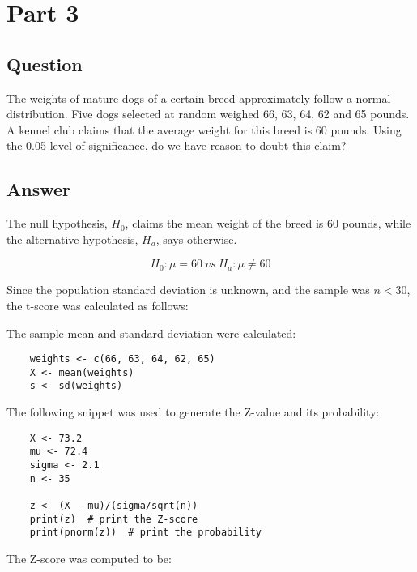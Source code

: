 \section{Part 3}
    \subsection{Question}
    The weights of mature dogs of a certain breed approximately follow a normal distribution. Five dogs selected at random weighed 66, 63, 64, 62 and 65 pounds. A kennel club claims that the average weight for this breed is 60 pounds. Using the 0.05 level of significance, do we have reason to doubt this claim?

    \subsection{Answer}
    The null hypothesis, $H_{0}$, claims the mean weight of the breed is 60 pounds, while the alternative hypothesis, $H_{a}$, says otherwise.

        \[ H_{0}: \mu = 60 \ vs \ H_{a}: \mu \neq 60 \]

    Since the population standard deviation is unknown, and the sample was $n < 30$, the t-score was calculated as follows:

    The sample mean and standard deviation were calculated:
\begin{lstlisting}
    weights <- c(66, 63, 64, 62, 65)
    X <- mean(weights)
    s <- sd(weights)
\end{lstlisting}

        


    The following snippet was used to generate the Z-value and its probability:
\begin{lstlisting}
    X <- 73.2
    mu <- 72.4
    sigma <- 2.1
    n <- 35

    z <- (X - mu)/(sigma/sqrt(n))
    print(z)  # print the Z-score
    print(pnorm(z))  # print the probability
\end{lstlisting}

    The Z-score was computed to be:

        
